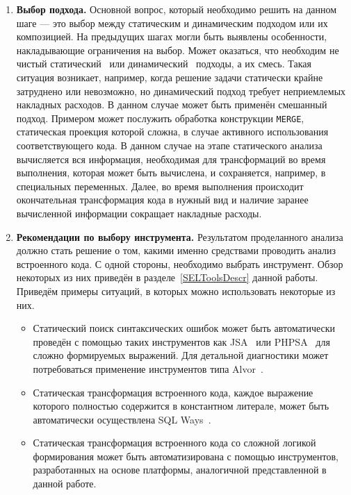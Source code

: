 \begin{enumerate}
  Отдельно нужно проверить наличие конструкций, которые заведомо усложняют автоматическую обработку системы. Примером такой конструкции может служить оператор \verb|MERGE|\footnote{Операция позволяющая обновременно добовлять новые записи и обновлять существующие. Описание в документации по языку PL-SQL: \url{http://docs.oracle.com/cd/B10500_01/appdev.920/a96624/13_elems30.htm}. Посешён 29.07.2015.} в PL-SQL, проекция которого в другие языки может потребовать существенных усилий.
  
  \item \textbf{Выбор подхода.} Основной вопрос, который необходимо решить на данном шаге --- это выбор между статическим и динамическим подходом или их композицией. На предыдущих шагах могли быть выявлены особенности, накладывающие ограничения на выбор. Может оказаться, что необходим не чистый статический~\cite{Syrcose} или динамический~\cite{DynamicDSQLTranslation} подходы, а их смесь. Такая ситуация возникает, например, когда решение задачи статически крайне затруднено или невозможно, но динамический подход требует неприемлемых накладных расходов. В данном случае может быть применён смешанный подход. Примером может послужить обработка конструкции \verb|MERGE|, статическая проекция которой сложна, в случае активного использования соответствующего кода. В данном случае на этапе статического анализа вычисляется вся информация, необходимая для трансформаций во время выполнения, которая может быть вычислена, и сохраняется, например, в специальных переменных. Далее, во время выполнения происходит окончательная трансформация кода в нужный вид и наличие заранее вычисленной информации сокращает накладные расходы.
  
  \item \textbf{Рекомендации по выбору инструмента.} Результатом проделанного анализа должно стать решение о том, какими именно средствами проводить анализ встроенного кода. С одной стороны, необходимо выбрать инструмент. Обзор некоторых из них приведён в разделе~\ref{SELToolsDescr} данной работы. Приведём примеры ситуаций, в которых можно использовать некоторые из них.
  \begin{itemize}
    \item Статический поиск синтаксических ошибок может быть автоматически проведён с помощью таких инструментов как JSA~\cite{JSAUrl} или PHPSA~\cite{PHPSAUrl} для сложно формируемых выражений. Для детальной диагностики может потребоваться применение инструментов типа Alvor~\cite{AlvorUrl}.
    \item Статическая трансформация встроенного кода, каждое выражение которого полностью содержится в константном литерале, может быть автоматически осуществлена SQL Ways~\cite{SQLWays}.
    \item Статическая трансформация встроенного кода со сложной логикой формирования может быть автоматизирована с помощью инструментов, разработанных на основе платформы, аналогичной представленной в данной работе.
  \end{itemize}
  

\end{enumerate}
